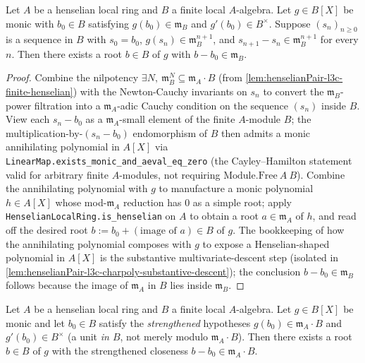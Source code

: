 \begin{lemma}
\label{lem:henselianPair-l3c-charpoly-descent}
Let $A$ be a henselian local ring and $B$ a finite local
$A$-algebra. Let $g \in B[X]$ be monic with $b_0 \in B$
satisfying $g(b_0) \in \mathfrak m_B$ and $g'(b_0) \in B^\times$.
Suppose $(s_n)_{n \ge 0}$ is a sequence in $B$ with $s_0 = b_0$,
$g(s_n) \in \mathfrak m_B^{n+1}$, and $s_{n+1} - s_n \in
\mathfrak m_B^{n+1}$ for every $n$. Then there exists a root
$b \in B$ of $g$ with $b - b_0 \in \mathfrak m_B$.
\end{lemma}

\begin{proof}

\leanok
Combine the nilpotency $\exists N,\ \mathfrak m_B^N \subseteq
\mathfrak m_A \cdot B$ (from
\cref{lem:henselianPair-l3c-finite-henselian}) with the
Newton-Cauchy invariants on $s_n$ to convert the $\mathfrak
m_B$-power filtration into a $\mathfrak m_A$-adic Cauchy
condition on the sequence $(s_n)$ inside $B$. View each $s_n -
b_0$ as a $\mathfrak m_A$-small element of the finite
$A$-module $B$; the multiplication-by-$(s_n - b_0)$ endomorphism
of $B$ then admits a monic annihilating polynomial in $A[X]$ via
\texttt{LinearMap.exists\_monic\_and\_aeval\_eq\_zero} (the
Cayley--Hamilton statement valid for arbitrary finite $A$-modules,
not requiring $\mathrm{Module.Free}\ A\ B$). Combine the
annihilating polynomial with $g$ to manufacture a monic
polynomial $h \in A[X]$ whose mod-$\mathfrak m_A$ reduction has
$0$ as a simple root; apply \texttt{HenselianLocalRing.is\_henselian}
on $A$ to obtain a root $a \in \mathfrak m_A$ of $h$, and read
off the desired root $b := b_0 + (\text{image of }a) \in B$ of
$g$. The bookkeeping of how the annihilating polynomial composes
with $g$ to expose a Henselian-shaped polynomial in $A[X]$ is the
substantive multivariate-descent step (isolated in
\cref{lem:henselianPair-l3c-charpoly-substantive-descent}); the
conclusion $b - b_0 \in \mathfrak m_B$ follows because the image
of $\mathfrak m_A$ in $B$ lies inside $\mathfrak m_B$.
\end{proof}

\begin{lemma}
\label{lem:henselianPair-l3c-charpoly-substantive-descent}
Let $A$ be a henselian local ring and $B$ a finite local
$A$-algebra. Let $g \in B[X]$ be monic and let $b_0 \in B$
satisfy the \emph{strengthened} hypotheses
$g(b_0) \in \mathfrak m_A \cdot B$ and
$g'(b_0) \in B^\times$ (a unit \emph{in $B$}, not merely modulo
$\mathfrak m_A \cdot B$). Then there exists a root $b \in B$ of
$g$ with the strengthened closeness
$b - b_0 \in \mathfrak m_A \cdot B$.
\end{lemma}

